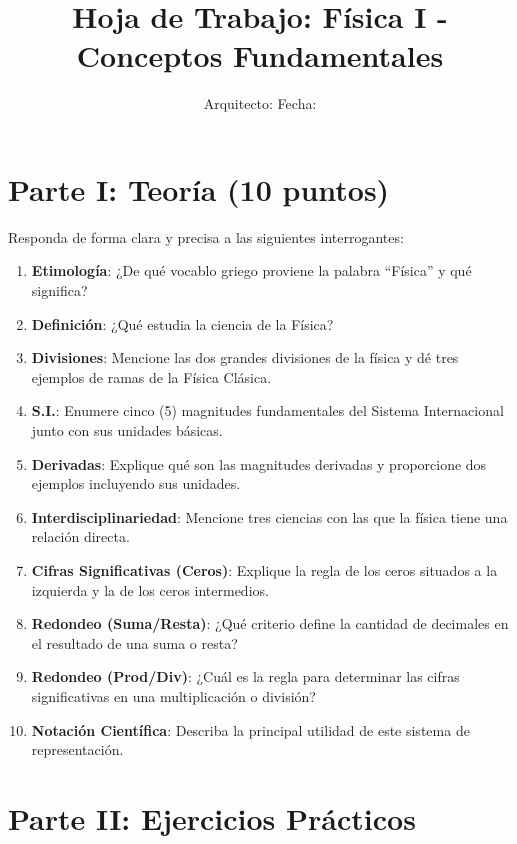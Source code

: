 \documentclass[a4paper,12pt]{article}
\title{Hoja de Trabajo: Física I - Conceptos Fundamentales}
\author{Arquitecto: \underline{\hspace{5cm}} \quad Fecha: \underline{\hspace{3cm}}}
\date{}
\begin{document}
\maketitle

\section{Parte I: Teoría (10 puntos)}
Responda de forma clara y precisa a las siguientes interrogantes:

\begin{enumerate}[itemsep=1.5em]
    \item \textbf{Etimología}: ¿De qué vocablo griego proviene la palabra ``Física'' y qué significa?
    \item \textbf{Definición}: ¿Qué estudia la ciencia de la Física?
    \item \textbf{Divisiones}: Mencione las dos grandes divisiones de la física y dé tres ejemplos de ramas de la Física Clásica.
    \item \textbf{S.I.}: Enumere cinco (5) magnitudes fundamentales del Sistema Internacional junto con sus unidades básicas.
    \item \textbf{Derivadas}: Explique qué son las magnitudes derivadas y proporcione dos ejemplos incluyendo sus unidades.
    \item \textbf{Interdisciplinariedad}: Mencione tres ciencias con las que la física tiene una relación directa.
    \item \textbf{Cifras Significativas (Ceros)}: Explique la regla de los ceros situados a la izquierda y la de los ceros intermedios.
    \item \textbf{Redondeo (Suma/Resta)}: ¿Qué criterio define la cantidad de decimales en el resultado de una suma o resta?
    \item \textbf{Redondeo (Prod/Div)}: ¿Cuál es la regla para determinar las cifras significativas en una multiplicación o división?
    \item \textbf{Notación Científica}: Describa la principal utilidad de este sistema de representación.
\end{enumerate}

\newpage

\section{Parte II: Ejercicios Prácticos}
\end{document}
